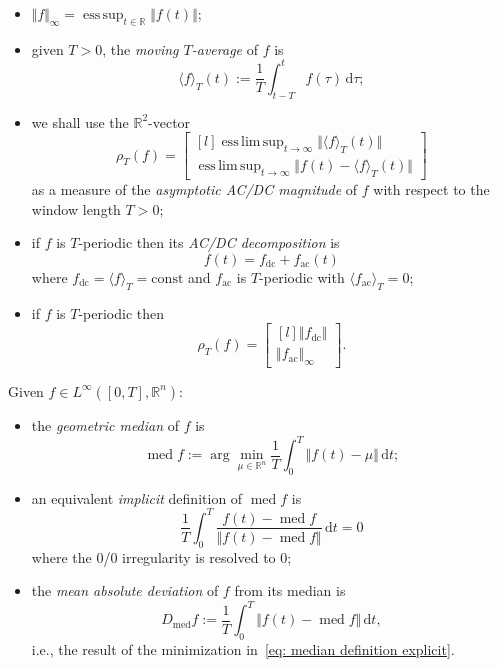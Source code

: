 \documentclass[letterpaper, 10 pt, conference]{ieeeconf}
\DeclareMathOperator{\median}{med}
\DeclareMathOperator*{\esssup}{ess\,sup}
\DeclareMathOperator*{\esslimsup}{ess\,lim\,sup}
\newcommand{\ac}{_\mathrm{ac}}
\newcommand{\dc}{_\mathrm{dc}}
\newcommand{\const}{\mathrm{const}}
\newcommand{\Linf}{L^\infty}
\newcommand{\dif}{\mathrm{d}}
\newcommand{\norm}[1]{\Vert #1 \Vert}
\newcommand{\normb}[1]{\big\Vert #1 \big\Vert}
\newcommand{\mean}[1]{\langle #1 \rangle}
\newcommand{\bbR}{\mathbb{R}}
\begin{document}
\begin{itemize}
    \item $\norm{f}_\infty = \esssup_{t \in \bbR} \norm{f(t)}$;
    \item given $T>0$, the \emph{moving $T$-average} of $f$ is
    \begin{equation}
        \mean{f}_T (t) := \frac1T \int_{t-T}^t f(\tau) \,\dif\tau;
    \end{equation}
    \item we shall use the $\bbR^2$-vector
    \begin{equation}
        \rho_T(f) = \begin{bmatrix*}[l]
            \esslimsup_{t\to\infty} \normb{\mean{f}_T(t)} \\
            \esslimsup_{t\to\infty} \normb{f(t) - \mean{f}_T(t)}
        \end{bmatrix*}
    \end{equation}
    as a measure of the \emph{asymptotic AC/DC magnitude} of $f$ with respect to the window length $T>0$;
    \item if $f$ is $T$-periodic then its \emph{AC/DC decomposition} is
    \begin{equation}
        f(t) = f\dc + f\ac(t)
    \end{equation}
    where $f\dc = \mean{f}_T = \const$ and $f\ac$ is $T$-periodic with $\mean{f\ac}_T = 0$;
    \item if $f$ is $T$-periodic then
    \begin{equation}
        \rho_T(f) = \begin{bmatrix*}[l]
            \norm{f\dc} \\
            \norm{f\ac}_\infty
        \end{bmatrix*}.
    \end{equation}
\end{itemize}
Given $f \in \Linf([0,T], \bbR^n)$:
\begin{itemize}
    \item the \emph{geometric median} of $f$ is
    \begin{equation}
        \label{eq: median definition explicit}
        \median f := \arg\min_{\mu \in \bbR^n} \frac1T \int_0^T \norm{f(t) - \mu} \,\dif t;
    \end{equation}
    \item an equivalent \emph{implicit} definition of $\median f$ is \cite[Eq.~(5)]{cardotEfficientFastEstimation2013}
    \begin{equation}
        \label{eq: median definition implicit}
        \frac1T \int_0^T \frac{f(t) - \median f}{\norm{f(t) - \median f}} \,\dif t = 0
    \end{equation}
    where the 0/0 irregularity is resolved to 0;
    \item the \emph{mean absolute deviation} of $f$ from its median is
    \begin{equation}
        D_{\median} f :=  \frac1T \int_0^T \norm{f(t) - \median f} \,\dif t,
    \end{equation}
    i.e., the result of the minimization in~\eqref{eq: median definition explicit}.
\end{itemize}
\end{document}
